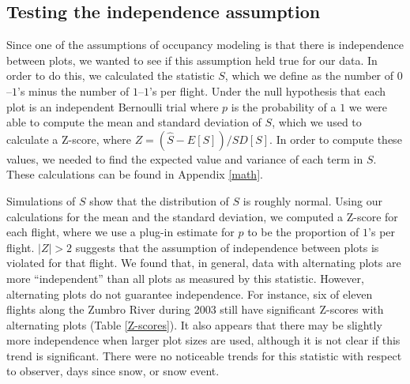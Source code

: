 \documentclass[12pt]{article}
\begin{document}
    \subsection{Testing the independence assumption}
    \label{shat}
    Since one of the assumptions of occupancy modeling is that there is
    independence between plots, we wanted to see if this assumption held true
    for our data.  In order to do this, we calculated the statistic \(S\), which
    we define as the number of \(0\)--\(1\)'s minus the number of
    \(1\)--\(1\)'s per flight. Under the null hypothesis that each
    plot is an independent Bernoulli trial where \(p\) is the probability of a
    \(1\) we were able
    to compute the mean and standard deviation of \(S\), which we used to
    calculate a Z-score, where \(Z = (\hat{S} - E[S])/SD[S]\). In order to
    compute these values, we needed to find the
    expected value and variance of each term in \(S\). These calculations can be
    found in Appendix \ref{math}.

    Simulations of \(S\) show that the distribution of \(S\) is roughly normal.
    Using our calculations for the mean and the standard deviation, we
    computed a Z-score for each flight, where we use a plug-in estimate for
    \(p\) to be the proportion of \(1\)'s per flight. \(|Z| > 2\) suggests that
    the assumption of
    independence between plots is violated for that flight. We found that, in
    general, data with alternating plots are more ``independent'' than all plots
    as measured
    by this statistic. However, alternating plots do not guarantee independence.
    For instance, six of eleven flights along the Zumbro River during 2003 still
    have significant Z-scores with alternating plots (Table \ref{Z-scores}). It
    also appears that there
    may be slightly more independence when larger plot sizes are used, although
    it is not clear if this trend is significant. There
    were no noticeable trends for this statistic with respect to observer, days
    since snow, or snow event.
\end{document}

